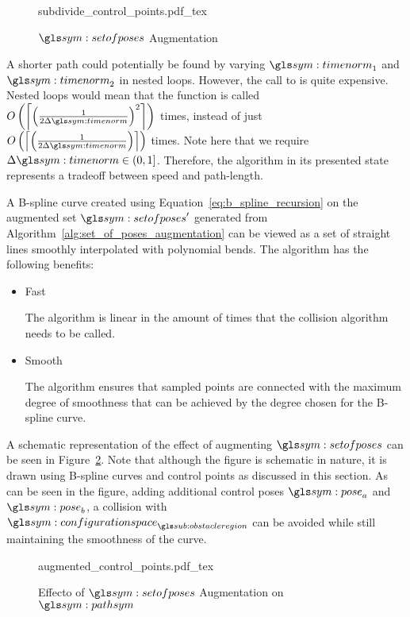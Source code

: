 		\begin{figure}[hbt]
			\centering
			\def\svgwidth{0.7\columnwidth}
			{subdivide_control_points.pdf_tex}
			\caption{$\setofposes$ Augmentation}%
			\label{fig:set_of_poses_augmentation}
		\end{figure}

		A shorter path could potentially be found by varying $\timenorm_1$ and
		$\timenorm_2$ in nested loops. However, the call to
		 is quite expensive. Nested loops
		would mean that the function is called
		\(
			O
			\left(
				\ceil*
				{%
					{%
						\left(
							\frac
							{%
								1
							}
							{%
								2\Delta\timenorm
							}
						\right)
					}^2
				}
			\right)
		\)
		times, instead of just
		\(
			O
			\left(
				\ceil*
				{%
					\left(
						\frac
						{%
							1
						}
						{%
							2\Delta\timenorm
						}
					\right)
				}
			\right)
		\)
		times. Note here that we require $\Delta\timenorm \in (0, 1]$.
		Therefore, the algorithm in its presented state represents a tradeoff
		between speed and path-length.

		A B-spline curve created using Equation~\ref{eq:b_spline_recursion} on
		the augmented set $\setofposes'$ generated from
		Algorithm~\ref{alg:set_of_poses_augmentation} can be viewed as a set of
		straight lines smoothly interpolated with polynomial bends. The
		algorithm has the following benefits:

		\begin{itemize}

			\item Fast

				The algorithm is linear in the amount of times that the
				collision algorithm needs to be called.

			\item Smooth

				The algorithm ensures that sampled points are connected with the
				maximum degree of smoothness that can be achieved by the degree
				chosen for the B-spline curve.
		\end{itemize}

		A schematic representation of the effect of augmenting $\setofposes$ can
		be seen in Figure~\ref{fig:set_of_poses_augmentation_path}. Note that
		although the figure is schematic in nature, it is drawn using B-spline
		curves and control points as discussed in this section.  As can be seen
		in the figure, adding additional control poses $\pose_a$ and $\pose_b$,
		a collision with $\configurationspace_{\obstacleregion}$ can be avoided
		while still maintaining the smoothness of the curve.

		\begin{figure}[hb]
			\centering
			\def\svgwidth{\columnwidth}
			{augmented_control_points.pdf_tex}
			\caption{Effecto of $\setofposes$ Augmentation on $\pathsym$}
			\label{fig:set_of_poses_augmentation_path}
		\end{figure}
